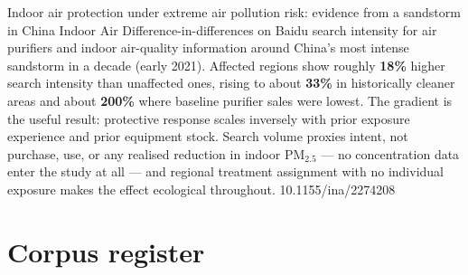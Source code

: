 \documentclass[10pt]{article}
\begin{document}

{Indoor air protection under extreme air pollution risk: evidence from a sandstorm in China}
{Indoor Air}
{Difference-in-differences on Baidu search intensity for air purifiers and indoor
air-quality information around China's most intense sandstorm in a decade (early 2021).
Affected regions show roughly \textbf{18\%} higher search intensity than unaffected ones,
rising to about \textbf{33\%} in historically cleaner areas and about \textbf{200\%} where
baseline purifier sales were lowest. The gradient is the useful result: protective
response scales inversely with prior exposure experience and prior equipment stock. Search
volume proxies intent, not purchase, use, or any realised reduction in indoor PM$_{2.5}$
--- no concentration data enter the study at all --- and regional treatment assignment with
no individual exposure makes the effect ecological throughout.}
{10.1155/ina/2274208}

\clearpage

\section*{\sffamily\bfseries\color{Deep}Corpus register}
\vspace{-1.5mm}{\color{Amber}\rule{\linewidth}{1.1pt}}\vspace{2.5mm}


\end{document}
